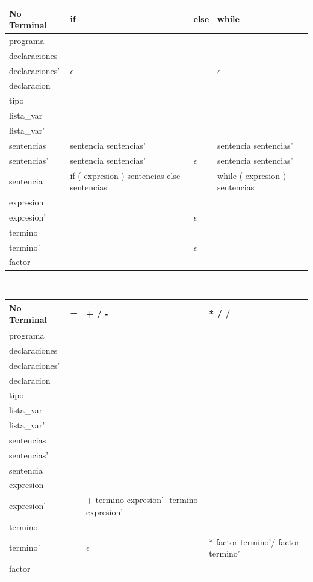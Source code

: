 \documentclass[11pt]{report}
\begin{document}
\begin{enumerate}
  \begin{tabular}{ |l|l|l|l| }
    \hline
    \textbf{No Terminal} & \textbf{if} & \textbf{else} & \textbf{while} \\
    \hline
    programa & & & \\
    declaraciones & & & \\
    declaraciones' & $\epsilon$ & & $\epsilon$ \\
    declaracion & & & \\
    tipo & & & \\
    lista\_var & & & \\
    lista\_var' & & & \\
    sentencias & sentencia sentencias' & & sentencia sentencias' \\
    sentencias' & sentencia sentencias' & $\epsilon$ & sentencia sentencias' \\
    sentencia & if ( expresion ) sentencias else sentencias & & while ( expresion ) sentencias \\
    expresion & & & \\
    expresion' & & $\epsilon$ & \\
    termino & & & \\
    termino' & & $\epsilon$ & \\
    factor & & & \\
    \hline
  \end{tabular} \\

  \begin{tabular}{ |l|l|l|l| }
    \hline
    \textbf{No Terminal} & \textbf{=} & \textbf{+ / -} & \textbf{* / /} \\
    \hline
    programa & & & \\
    declaraciones & & & \\
    declaraciones' & & & \\
    declaracion & & & \\
    tipo & & & \\
    lista\_var & & & \\
    lista\_var' & & & \\
    sentencias & & & \\
    sentencias' & & & \\
    sentencia & & & \\
    expresion & & & \\
    expresion' & & + termino expresion'- termino expresion' & \\
    termino & & & \\
    termino' & & $\epsilon$ & * factor termino'/ factor termino' \\
    factor & & & \\
    \hline
  \end{tabular} \\


\end{enumerate}
\end{document}
